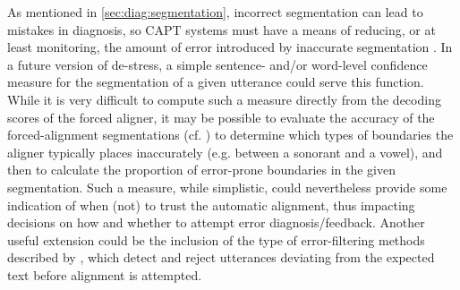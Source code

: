	
	
	As mentioned in \cref{sec:diag:segmentation}, 
	incorrect segmentation can lead to mistakes in diagnosis, so CAPT systems must have a means of reducing, or at least monitoring, the amount of error introduced by inaccurate segmentation \citep{Eskenazi2009}. 
	In a future version of de-stress, a simple sentence- and/or word-level confidence measure for the segmentation of a given utterance could serve this function. 
	While it is very difficult to compute such a measure directly from the decoding scores of the forced aligner, it may be possible to evaluate the accuracy of the forced-alignment segmentations (cf. \cite{Mesbahi2011}) to determine 
	which types of boundaries the aligner typically places inaccurately (e.g. between a sonorant and a vowel), and then to calculate the proportion of error-prone boundaries in the given segmentation. Such a measure, while simplistic, could nevertheless provide some indication of when (not) to trust the automatic alignment, thus impacting decisions on how and whether to attempt error diagnosis/feedback.
	Another useful extension could be the inclusion of the type of error-filtering methods described by \textcite{Bonneau2012,Orosanu2012}, which detect and reject utterances deviating from the expected text before alignment is attempted.
	
	
	
	
	
	
	
	
	

	
	
	
